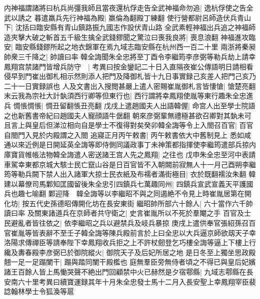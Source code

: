 内神福謂諸將曰杭兵尚彊我師且當夜還杭俘走告全武神福命勿追|{
	逸杭俘使之告全武以誘之}
暮遣羸兵先行神福為殿|{
	羸倫為翻殿丁練翻}
使行營都尉呂師造伏兵青山下|{
	沈括曰臨安縣有青山鎮路振九國志作設伏青山路}
全武素輕神福出兵追之神福師造夾擊大破之斬首五千級生擒全武錢鏐聞之驚泣曰喪我良將|{
	喪息浪翻}
神福進攻臨安|{
	臨安縣錢鏐所起之地衣錦軍在焉九域志臨安縣在杭州西一百二十里}
兩浙將秦昶帥衆三千降之|{
	帥讀曰率}
韓全誨聞朱全忠將至丁酉令李繼筠李彦弼等勒兵劫上請幸鳳翔宫禁諸門皆增兵防守　|{
	考異曰按金鑾記二十日入直隔夜崔公傳語明日請相看侵早到門崔出御札相示然則添人把門及降御札皆十九日事實録己亥差人把門己亥乃二十一日實録誤也}
人及文書出入搜閲甚嚴上遣人密賜崔胤御札言皆悽愴|{
	愴楚亮翻}
末云我為宗社大計埶須西行卿等但東行也|{
	西行謂將幸鳳翔使胤等東行趣朱全忠進兵}
惆悵惆悵|{
	惆丑留翻悵丑亮翻}
戊戌上遣趙國夫人出語韓偓|{
	命宫人出至學士院語之也新舊書帝紀曰趙國夫人寵顔語牛倨翻}
朝來彦弼輩無禮極甚欲召卿對其埶未可且言上與皇后但涕泣相向自是學士不復得對矣癸卯韓全誨等令上入閤召百官|{
	百官自閤門入見於内殿謂之入閤}
追寢正月丙午敕書|{
	丙午敕書依大中舊制見上}
悉如咸通以來近例是日開延英全誨等即侍側同議政事丁未神策都指揮使李繼筠遣部兵掠内庫寶貨帷帳法物韓全誨遣人密送諸王宫人先之鳳翔|{
	之往也}
戊申朱全忠至河中表請車駕幸東都京城大駭士民亡竄山谷是日百官皆不入朝闕前寂無人十一月己酉朔李繼筠等勒兵闕下禁人出入諸軍大掠士民衣紙及布襦者滿街極目|{
	衣於既翻襦汝朱翻}
韓建以幕僚司馬鄴知匡國留後朱全忠引四鎮兵七萬趣同州|{
	四鎮兵宣武宣義天平護國兵也趣七喻翻}
鄴迎降　韓全誨等以李繼昭不與之同遏絶不令見上時崔胤居第在開化坊|{
	按五代史孫德昭傳開化坊在長安東街}
繼昭帥所部六十餘人|{
	六十當作六千帥讀曰率}
及關東諸道兵在京師者共守衛之|{
	史言崔胤所以不死於羣閹之手}
百官及士民避亂者皆往依之|{
	依李繼昭之兵以避禁兵及岐兵暴掠}
庚戌上遣供奉官張紹孫召百官崔胤等皆表辭不至壬子韓全誨等陳兵殿前言於上曰全忠以大兵逼京師欲刼天子幸洛陽求傳禪臣等請奉陛下幸鳳翔收兵拒之上不許杖劒登乞巧樓全誨等逼上下樓上行纔及夀春殿李彦弼已於御院縱火|{
	御院天子及后妃所居之地}
是日冬至上獨坐思政殿翹一足一足蹋闌干|{
	蹋與踏同闌干殿檻也}
庭無羣臣旁無侍者頃之不得已與皇后妃嬪諸王百餘人皆上馬慟哭聲不絶出門回顧禁中火已赫然是夕宿鄠縣|{
	九域志鄠縣在長安南六十里考異曰續寶運録其年十月朱全忠發士馬十二月入長安聖上幸鳳翔宰臣裴諗翰林學士令狐渙等扈}


